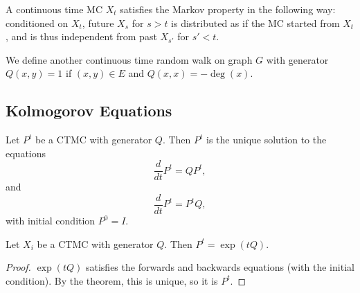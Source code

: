 \begin{theorem}
\proplabel

A continuous time MC $X_t$ satisfies the Markov property in the following way: conditioned on $X_t$, future $X_s$ for $s > t$ is distributed as if the MC started from $X_t$, and is thus independent from past $X_{s'}$ for $s' < t$. 
\end{theorem}


\begin{example}
\exlabel

We define another continuous time random walk on graph $G$ with generator $Q(x,y) = 1$ if $(x,y)\in E$ and $Q(x,x) = -\deg(x)$. 
\end{example}

\subsection{Kolmogorov Equations}

\begin{theorem}

Let $P^t$ be a CTMC with generator $Q$. Then $P^t$ is the unique solution to the equations 
\[\frac{d}{dt}P^t = QP^t,\]
and 
\[\frac{d}{dt}P^t = P^tQ,\]
with initial condition $P^0 = I$.
\end{theorem}

\begin{theorem}
\corlabel

Let $X_i$ be a CTMC with generator $Q$. Then $P^t = \exp(tQ)$. 
\end{theorem}

\begin{proof}
$\exp(tQ)$ satisfies the forwards and backwards equations (with the initial condition). By the theorem, this is unique, so it is $P^t$. 
\end{proof}

